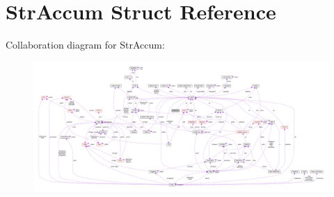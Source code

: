 \hypertarget{structStrAccum}{}\section{Str\+Accum Struct Reference}
\label{structStrAccum}


Collaboration diagram for Str\+Accum\+:\nopagebreak
\begin{figure}[H]
\begin{center}
\leavevmode
\includegraphics[width=350pt]{structStrAccum__coll__graph}
\end{center}
\end{figure}
